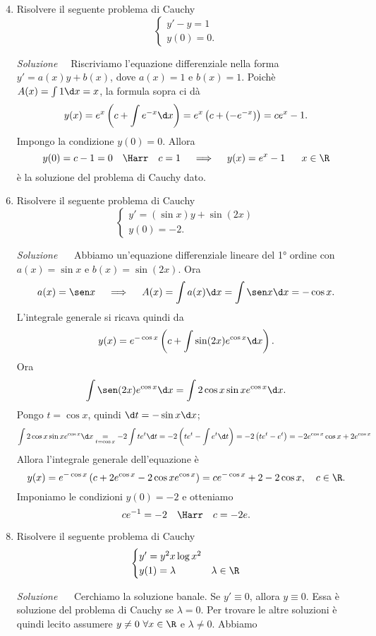 \documentclass{article}
\begin{document}
\begin{enumerate}[label=\textbf{Esercizio 13.\arabic*.},itemindent=*]
\setcounter{enumi}{3}
\item Risolvere il seguente problema di Cauchy
\[\begin{cases}
    y'-y=1\\
    y(0)=0.
\end{cases}\]
\item[\textit{\large Soluzione~}]~Riscriviamo l'equazione differenziale nella forma $y'=a(x)y+b(x)$, dove $a(x)=1$ e $b(x)=1$. Poichè
$A(x)=\int1\d x=x$, la formula sopra ci dà
\[y(x)=e^x\left( c+\int e^{-x}\d x \right)=e^{x}\left( c +(-e^{-x}) \right)=ce^x-1.\]
Impongo la condizione $y(0)=0$. Allora
\[y(0)=c-1 = 0~~~\Harr~~~c=1~~~\implies ~~~y(x)=e^{x}-1~~~~~x\in \R\]
è la soluzione del problema di Cauchy dato.
\item Risolvere il seguente problema di Cauchy
\[\begin{cases}
    y'=\left( \sin x \right)y+\sin(2x)\\
    y(0)=-2.
\end{cases}\]
\item[\textit{\large Soluzione~}]~ Abbiamo un'equazione differenziale lineare del 1° ordine con $a(x)=\sin x$ e $b(x)=\sin (2x)$. Ora
\[a(x)=\sen x~~~\implies~~~A(x)=\int a(x)\d x=\int \sen x \d x=-\cos x.\]
L'integrale generale si ricava quindi da 
\[y(x)=e^{ -\cos x}\left( c+\int \sin (2x) e^{\cos x} \d x \right).\]
Ora
\[\int \sen(2x)e^{\cos x}\d x=\int 2\cos x \sin x e^{\cos x}\d x.\]
Pongo $t=\cos x$, quindi $\d t=-\sin x \d x$;
\[\int 2\cos x \sin xe^{\cos x}\d x \underset{t =\cos x}{= } -2\int te^t\d t=-2\left( te^t-\int e^t\d t \right)=-2\left(te^t-e^t\right)=-2e^{\cos x}\cos x+2e^{\cos x}\]
Allora l'integrale generale dell'equazione è
\[y(x)=e^{-\cos x}\left( c+2e^{\cos x}-2\cos xe^{\cos x} \right)=ce^{-\cos x}+2-2\cos x,\quad c\in \R.\]
Imponiamo le condizioni $y(0)=-2$ e otteniamo
\[ce^{-1}=-2~~~\Harr~~~c=-2e .\]
\item Risolvere il seguente problema di Cauchy
\[\begin{cases}
    y'=y^2x\log x^2\\
    y(1)=\lambda&\lambda \in \R
\end{cases}\]
\item[\textit{\large Soluzione~}]~
Cerchiamo la soluzione banale. Se $y'\equiv 0$, allora $y\equiv 0$. Essa è soluzione del problema di Cauchy se $\lambda=0$.
Per trovare le altre soluzioni è quindi lecito assumere $y\neq 0~ \forall x \in \R$ e $\lambda \neq 0$.
Abbiamo


\end{enumerate}
\end{document}
